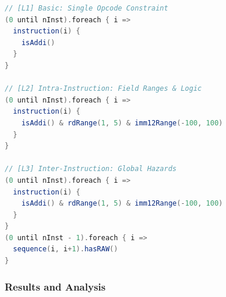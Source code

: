 \documentclass[sigconf]{acmart}
\begin{document}
\begin{lstlisting}[caption={Benchmark Constraint Definitions across Complexity Levels}, label=code:perf_constraints, language=Scala]
// [L1] Basic: Single Opcode Constraint
(0 until nInst).foreach { i => 
  instruction(i) { 
    isAddi() 
  }
}

// [L2] Intra-Instruction: Field Ranges & Logic
(0 until nInst).foreach { i =>
  instruction(i) {
    isAddi() & rdRange(1, 5) & imm12Range(-100, 100)
  }
}

// [L3] Inter-Instruction: Global Hazards
(0 until nInst).foreach { i =>
  instruction(i) {
    isAddi() & rdRange(1, 5) & imm12Range(-100, 100)
  }
}
(0 until nInst - 1).foreach { i =>
  sequence(i, i+1).hasRAW()
}
\end{lstlisting}

\subsubsection{Results and Analysis}

\begin{table}[!tbp]
\centering
\renewcommand\tabcolsep{4.5pt}
\captionsetup{font=bf, skip=0.5em}
\caption{Performance metrics (in ms) across complexity levels and instruction counts.}
\label{tab:performance}
\end{table}
\end{document}
